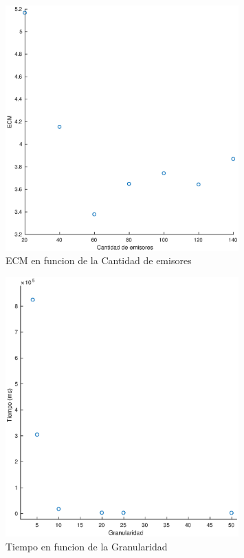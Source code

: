 \begin{figure}[H]
	\centering	\includegraphics[width=0.8\textwidth]{img/emi_ecm}
	\caption{ECM en funcion de la Cantidad de emisores}
	\label{fig:emi_ecm}
\end{figure}


\begin{figure}[H]
	\centering	\includegraphics[width=0.8\textwidth]{img/granu_tiempo}
	\caption{Tiempo en funcion de la Granularidad}
	\label{fig:granu_tiempo}
\end{figure}


